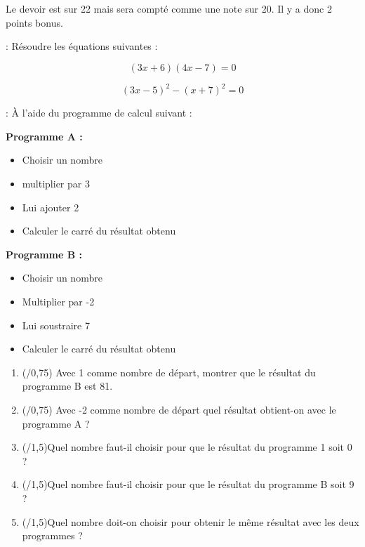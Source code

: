 Le devoir est sur 22 mais sera compté comme une note sur 20. Il y a donc 2 points bonus.

 : Résoudre les équations suivantes : 

\begin{minipage}{0.45\textwidth}
    $$(3x+6)(4x-7)=0$$
    \vspace*{15cm}
\end{minipage}
\hfil
\vrule
\hfil
\begin{minipage}{0.45\textwidth}
    $$(3x-5)^2-(x+7)^2=0$$
    \vspace*{15cm}
\end{minipage}

\newpage

 : À l'aide du programme de calcul suivant :


\begin{multicols}{2}
    \textbf{Programme A :}
    \begin{itemize}
        \item Choisir un nombre
        \item multiplier par 3
        \item Lui ajouter 2
        \item Calculer le carré du résultat obtenu
    \end{itemize}

    \textbf{Programme B :}
    \begin{itemize}
        \item Choisir un nombre
        \item Multiplier par -2
        \item Lui soustraire 7
        \item Calculer le carré du résultat obtenu
    \end{itemize}
\end{multicols}

\begin{enumerate}
    \item (\hspace{5ex}/0,75) Avec 1 comme nombre de départ, montrer que le résultat du programme B est 81.
    \item (\hspace{5ex}/0,75) Avec -2 comme nombre de départ quel résultat obtient-on avec le programme A ?
    \item (\hspace{5ex}/1,5)Quel nombre faut-il choisir pour que le résultat du programme 1 soit 0 ?
    \item (\hspace{5ex}/1,5)Quel nombre faut-il choisir pour que le résultat du programme B soit 9 ?
    \item (\hspace{5ex}/1,5)Quel nombre doit-on choisir pour obtenir le même résultat avec les deux programmes ?
\end{enumerate}

